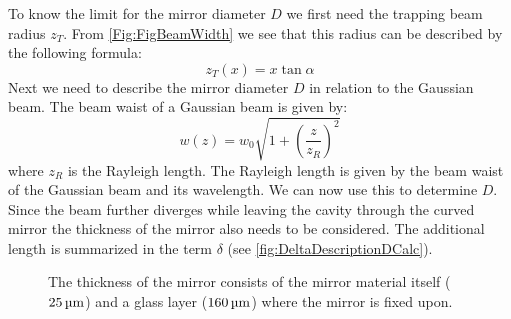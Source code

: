 To know the limit for the mirror diameter $D$ we first need the trapping beam radius $z_{\si{T}}$. From \autoref{Fig:FigBeamWidth} we see that this radius can be described by the following formula:
\begin{equation}\label{EqTrapRadius}
	z_{\si{T}}(x)=x\tan\alpha
\end{equation}
Next we need to describe the mirror diameter $D$ in relation to the Gaussian beam. The beam waist of a Gaussian beam is given by:
\begin{equation}
	w(z)=w_0\sqrt{1+\left(\frac{z}{z_{{\si{R}}}}\right)^2}
\end{equation}
where $z_{\si{R}}$ is the Rayleigh length. The Rayleigh length is given by the beam waist of the Gaussian beam and its wavelength. We can now use this to determine $D$. Since the beam further diverges while leaving the cavity through the curved mirror the thickness of the mirror also needs to be considered. The additional length is summarized in the term $\delta$ (see \autoref{fig:DeltaDescriptionDCalc}).
\begin{figure}[H]
	
	\caption{The thickness of the mirror consists of the mirror material itself ($25\um$) and a glass layer ($160\um$) where the mirror is fixed upon.}
	\label{fig:DeltaDescriptionDCalc}
\end{figure}

